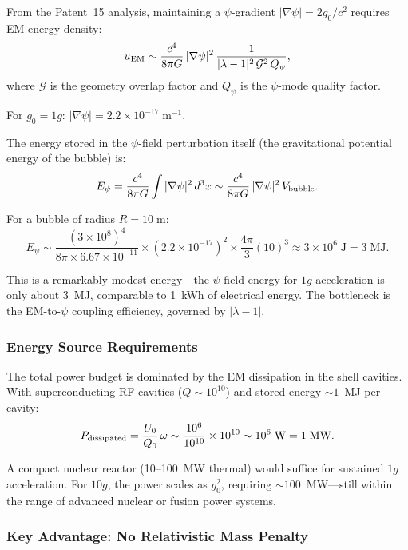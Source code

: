 \documentclass[aps,prd,twocolumn,superscriptaddress,nofootinbib]{revtex4-2}
\newcommand{\ee}[1]{\times 10^{#1}}
\begin{document}
From the Patent~15 analysis, maintaining a $\psi$-gradient
$|\nabla\psi| = 2g_0/c^2$ requires EM energy density:
\begin{equation}\label{eq:em-power}
u_{\rm EM} \sim \frac{c^4}{8\pi G}\,|\nabla\psi|^2\,
\frac{1}{|\lambda - 1|^2\,\mathcal{G}^2\,Q_\psi},
\end{equation}
where $\mathcal{G}$ is the geometry overlap factor and $Q_\psi$ is the
$\psi$-mode quality factor.

For $g_0 = 1g$: $|\nabla\psi| = 2.2\ee{-17}\;\text{m}^{-1}$.

The energy stored in the $\psi$-field perturbation itself (the
gravitational potential energy of the bubble) is:
\begin{equation}
E_\psi = \frac{c^4}{8\pi G}\int |\nabla\psi|^2\,d^3x
\sim \frac{c^4}{8\pi G}\,|\nabla\psi|^2\,V_{\rm bubble}.
\end{equation}

For a bubble of radius $R = 10\;\text{m}$:
\begin{equation}
E_\psi \sim \frac{(3\ee{8})^4}{8\pi\times 6.67\ee{-11}}
\times (2.2\ee{-17})^2 \times \frac{4\pi}{3}(10)^3
\approx 3\ee{6}\;\text{J} = 3\;\text{MJ}.
\end{equation}

This is a remarkably modest energy---the $\psi$-field energy for
$1g$ acceleration is only about 3~MJ, comparable to 1~kWh of
electrical energy.  The bottleneck is the EM-to-$\psi$ coupling
efficiency, governed by $|\lambda - 1|$.

\subsubsection{Energy Source Requirements}

The total power budget is dominated by the EM dissipation in the
shell cavities.  With superconducting RF cavities ($Q \sim 10^{10}$)
and stored energy $\sim 1$~MJ per cavity:
\begin{equation}
P_{\rm dissipated} = \frac{U_0}{Q_0}\,\omega \sim
\frac{10^6}{10^{10}} \times 10^{10} \sim 10^6\;\text{W} = 1\;\text{MW}.
\end{equation}

A compact nuclear reactor (10--100~MW thermal) would suffice for
sustained $1g$ acceleration.  For $10g$, the power scales as
$g_0^2$, requiring $\sim 100$~MW---still within the range of
advanced nuclear or fusion power systems.

\subsubsection{Key Advantage: No Relativistic Mass Penalty}
\end{document}
